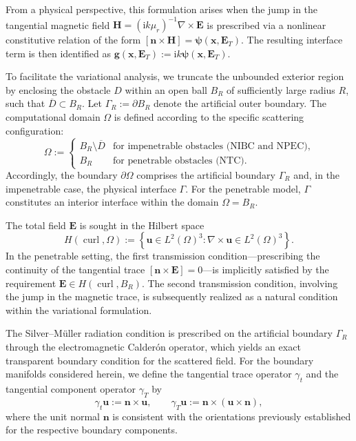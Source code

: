 \documentclass[12pt,reqno]{amsart}
\theoremstyle{definition}
\numberwithin{equation}{section}
\begin{document}
\begin{itemize}
    From a physical perspective, this formulation arises when the jump in the tangential magnetic field $\mathbf{H} = (\mathrm{i}k\mu_r)^{-1} \nabla \times \mathbf{E}$ is prescribed via a nonlinear constitutive relation of the form $[\mathbf{n} \times \mathbf{H}] = \boldsymbol{\psi}(\boldsymbol{x}, \mathbf{E}_T)$. The resulting interface term is then identified as $\mathbf{g}(\boldsymbol{x}, \mathbf{E}_T):= \mathrm{i}k \boldsymbol{\psi}(\boldsymbol{x}, \mathbf{E}_T)$.
\end{itemize}





To facilitate the variational analysis, we truncate the unbounded exterior region by enclosing the obstacle $D$ within an open ball $B_R$ of sufficiently large radius $R$, such that $\overline{D} \subset B_R$. Let $\Gamma_R:= \partial B_R$ denote the artificial outer boundary. The computational domain $\Omega$ is defined according to the specific scattering configuration:
\[
\Omega:=
\begin{cases}
B_R \setminus \overline{D} & \text{for impenetrable obstacles (NIBC and NPEC),} \\
B_R & \text{for penetrable obstacles (NTC).}
\end{cases}
\]
Accordingly, the boundary $\partial\Omega$ comprises the artificial boundary $\Gamma_R$ and, in the impenetrable case, the physical interface $\Gamma$. For the penetrable model, $\Gamma$ constitutes an interior interface within the domain $\Omega = B_R$.

The total field $\mathbf{E}$ is sought in the Hilbert space
\[
H(\operatorname{curl}, \Omega):= \left\{ \mathbf{u} \in L^2(\Omega)^3 : \nabla \times \mathbf{u} \in L^2(\Omega)^3 \right\}.
\]
In the penetrable setting, the first transmission condition---prescribing the continuity of the tangential trace $[\mathbf{n} \times \mathbf{E}] = 0$---is implicitly satisfied by the requirement $\mathbf{E} \in H(\operatorname{curl}, B_R)$. The second transmission condition, involving the jump in the magnetic trace, is subsequently realized as a natural condition within the variational formulation.

The Silver--M\"uller radiation condition is prescribed on the artificial boundary $\Gamma_R$ through the electromagnetic Calder\'on operator, which yields an exact transparent boundary condition for the scattered field. For the boundary manifolds considered herein, we define the tangential trace operator $\gamma_t$ and the tangential component operator $\gamma_T$ by
\[
\gamma_t \mathbf{u} := \mathbf{n} \times \mathbf{u}, \qquad \gamma_T \mathbf{u} := \mathbf{n} \times (\mathbf{u} \times \mathbf{n}),
\]
where the unit normal $\mathbf{n}$ is consistent with the orientations previously established for the respective boundary components.
\end{document}
